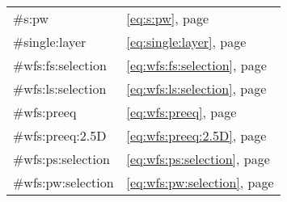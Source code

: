 \begin{longtable}{ll}
    \#s:pw                    & \eqref{eq:s:pw},                      page \pageref{eq:s:pw} \\
    \#single:layer            & \eqref{eq:single:layer},              page \pageref{eq:single:layer} \\
    \#wfs:fs:selection        & \eqref{eq:wfs:fs:selection},          page \pageref{eq:wfs:fs:selection} \\
    \#wfs:ls:selection        & \eqref{eq:wfs:ls:selection},          page \pageref{eq:wfs:ls:selection} \\
    \#wfs:preeq               & \eqref{eq:wfs:preeq},                 page \pageref{eq:wfs:preeq} \\
    \#wfs:preeq:2.5D          & \eqref{eq:wfs:preeq:2.5D},            page \pageref{eq:wfs:preeq:2.5D} \\
    \#wfs:ps:selection        & \eqref{eq:wfs:ps:selection},          page \pageref{eq:wfs:ps:selection} \\
    \#wfs:pw:selection        & \eqref{eq:wfs:pw:selection},          page \pageref{eq:wfs:pw:selection} \\
\end{longtable}


